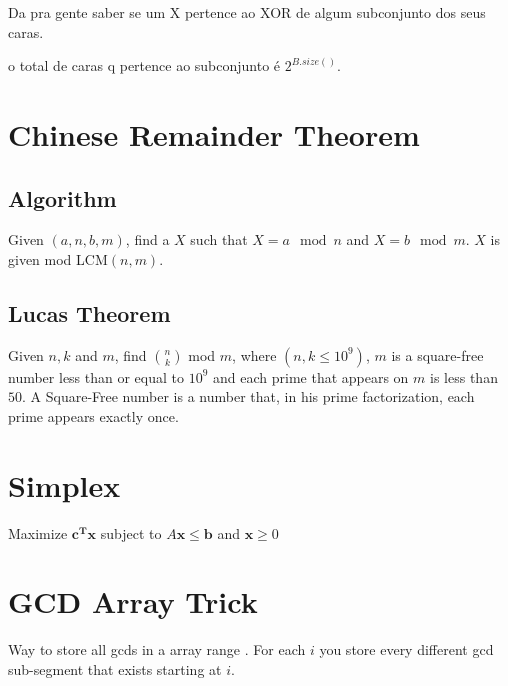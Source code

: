     Da pra gente saber se um X pertence ao XOR de algum subconjunto dos seus caras.

    o total de caras q pertence ao subconjunto é $2^{B.size()}$.

    
    
    \section{Chinese Remainder Theorem}


    \subsection{Algorithm}

    Given $(a, n, b, m)$, find a $X$ such that $X = a \mod n$ and $X = b \mod m$. $X$ is given mod LCM$(n, m)$.
    

    \subsection{Lucas Theorem}

    Given $n, k$ and $m$, find $\binom{n}{k}$ mod $m$, where $(n, k \le 10^{9})$, $m$ is a square-free number less than or equal to $10^{9}$ and each prime that appears on $m$ is less than $50$. A Square-Free number is a number that, in his prime factorization, each prime appears exactly once.

    
    
    \section{Simplex}
    Maximize ${\textstyle \mathbf {c^{T}} \mathbf {x} }$
subject to ${\displaystyle A\mathbf {x} \leq \mathbf {b} }$ and ${\displaystyle \mathbf {x} \geq 0}$
    
    \section{GCD Array Trick}
    Way to store all gcds in a array range . For each $i$ you store every different gcd sub-segment that exists starting at $i$.
    
